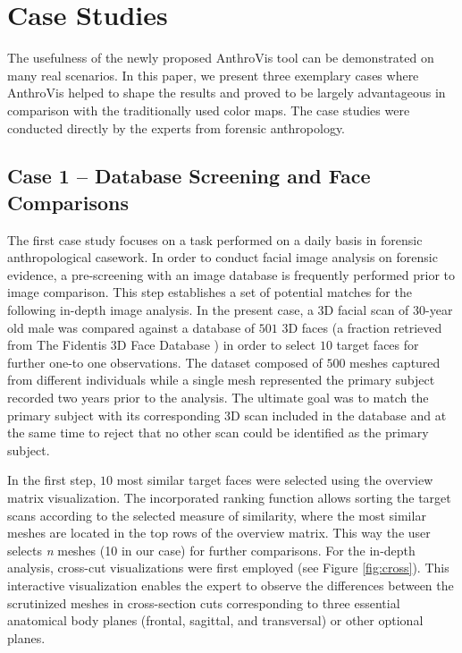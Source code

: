 \documentclass[final,5p,times]{elsarticle}
\begin{document}
\section{Case Studies} \label{results}
The usefulness of the newly proposed AnthroVis tool can be demonstrated on many real scenarios.
In this paper, we present three exemplary cases where AnthroVis helped to shape the results and proved to be largely advantageous in comparison with the traditionally used color maps.
The case studies were conducted directly by the experts from forensic anthropology.

\subsection{Case 1 -- Database Screening and Face Comparisons}
The first case study focuses on a task performed on a daily basis in forensic anthropological casework. 
In order to conduct facial image analysis on forensic evidence, a pre-screening with an image database is frequently performed prior to image comparison. 
This step establishes a set of potential matches for the following in-depth image analysis.
In the present case, a 3D facial scan of $30$-year old male was compared against a database of $501$ 3D faces (a fraction retrieved from The Fidentis 3D Face Database \cite{F3DFD}) in order to select $10$ target faces for further one-to one observations.
The dataset composed of $500$ meshes captured from different individuals while a single mesh represented the primary subject recorded two years prior to the analysis. The ultimate goal was to match the primary subject with its corresponding 3D scan included in the database and at the same time to reject that no other scan could be identified as the primary subject. 

In the first step, $10$ most similar target faces were selected using the overview matrix visualization.
The incorporated ranking function allows sorting the target scans according to the selected measure of similarity, where the most similar meshes are located in the top rows of the overview matrix. 
This way the user selects \textit{n} meshes (10 in our case) for further comparisons. 
For the in-depth analysis, cross-cut visualizations were first employed (see Figure \ref{fig:cross}).
This interactive visualization enables the expert to observe the differences between the scrutinized meshes in cross-section cuts corresponding to three essential anatomical body planes (frontal, sagittal, and transversal) or other optional planes. 
\end{document}

